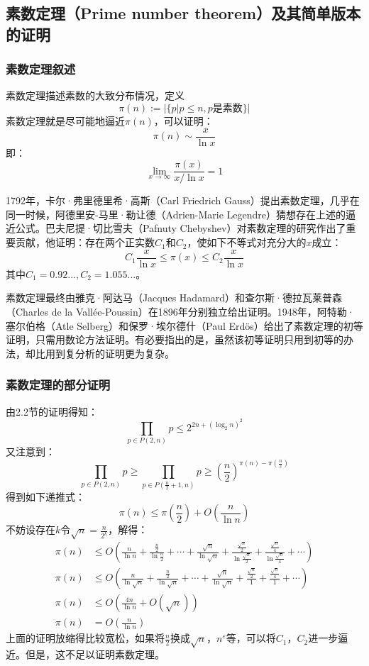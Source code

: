 ﻿\documentclass[11pt]{article}
\begin{document}
    \subsection{素数定理（Prime number theorem）及其简单版本的证明}
    \subsubsection{素数定理叙述}
    素数定理描述素数的大致分布情况，定义
    \[\pi(n):=|\{p|p\leq n,p\textrm{是素数}\}|\]
    素数定理就是尽可能地逼近$\pi(n)$，可以证明：
    \[\pi(n)\sim\frac{x}{\ln x}\]
    即：
    \[\lim_{x\to\infty} \frac{\pi(x)}{x/\ln x} = 1 \tag{1}\]

    1792年，卡尔·弗里德里希·高斯（Carl Friedrich Gauss）提出素数定理，几乎在同一时候，阿德里安-马里·勒让德（Adrien-Marie Legendre）猜想存在上述的逼近公式。巴夫尼提·切比雪夫（Pafnuty Chebyshev）对素数定理的研究作出了重要贡献，他证明：存在两个正实数$C_1$和$C_2$，使如下不等式对充分大的$x$成立：
    \[C_1\frac{x}{\ln x} \leq \pi(x) \leq C_2\frac{x}{\ln x}\]
    其中$C_1=0.92...,C_2=1.055...$。

    素数定理最终由雅克·阿达马（Jacques Hadamard）和查尔斯·德拉瓦莱普森（Charles de la Vallée-Poussin）在1896年分别独立给出证明。1948年，阿特勒·塞尔伯格（Atle Selberg）和保罗·埃尔德什（Paul Erd\"os）给出了素数定理的初等证明，只需用数论方法证明。有必要指出的是，虽然该初等证明只用到初等的办法，却比用到复分析的证明更为复杂。

    \subsubsection{素数定理的部分证明}
    由2.2节的证明得知：
    \[\prod_{p \in P(2,n)}p \leq 2^{2n+(\log_{2}n)^2}\]
    又注意到：
    \[\prod_{p \in P(2,n)}p \geq \prod_{p\in P(\frac{n}{2}+1,n)}p \geq \left(\frac{n}{2}\right)^{\pi(n)-\pi(\frac{n}{2})}\]
    得到如下递推式：
    \[\pi(n) \leq \pi\left(\frac{n}{2}\right)+O\left(\frac{n}{\ln n}\right)\]
    不妨设存在$k$令$\sqrt{n}=\frac{n}{2^k}$，解得：
    \begin{align*}
        \pi(n) &\leq O\left(\frac{n}{\ln n}+\frac{\frac{n}{2}}{\ln \frac{n}{2}}+\cdots+\frac{\sqrt{n}}{\ln \sqrt{n}}+\frac{\frac{\sqrt{n}}{2}}{\ln {\frac{\sqrt{n}}{2}}}+
            \frac{\frac{\sqrt{n}}{4}}{\ln {\frac{\sqrt{n}}{4}}}+\cdots\right)\\
        \pi(n) &\leq O\left(\frac{n}{\ln \sqrt{n}}+\frac{\frac{n}{2}}{\ln \sqrt{n}}+\cdots+\frac{\sqrt{n}}{\ln \sqrt{n}}+\frac{\frac{\sqrt{n}}{2}}{1}+
            \frac{\frac{\sqrt{n}}{4}}{1}+\cdots\right)\\
        \pi(n) &\leq O\left(\frac{4n}{\ln n}+O(\sqrt{n})\right)\\
        \pi(n) &= O\left(\frac{n}{\ln n}\right)
    \end{align*}
    上面的证明放缩得比较宽松，如果将$\frac{n}{2}$换成$\sqrt{n}$，$n^{\varepsilon}$等，可以将$C_{1}$，$C_{2}$进一步逼近。但是，这不足以证明素数定理。
\end{document}
